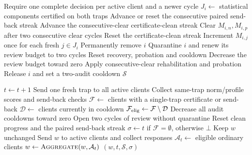 \begin{algorithm}[!htb]
\caption{Phase III: confirm evidence and bound review}\label{alg:confirmation}
\begin{algorithmic}[1]\small
{}
 \State Require one complete decision per active client and a newer cycle
  \State $J_i\gets$ statistical components certified on both traps
  \State Advance or reset the consecutive paired send-back streak
   \State Advance the consecutive-clear certificate-clean streak
   \State Clear $M_{i,n},M_{i,p}$ after two consecutive clear cycles
  \Else
   \State Reset the certificate-clean streak
   \State Increment $M_{i,j}$ once for each fresh $j\in J_i$\label{ln:confirm:increment}
  \EndIf
   \State Permanently remove $i$\label{ln:confirm:remove}
   \State Quarantine $i$ and renew its review budget to two cycles\label{ln:confirm:review}
   \State Reset recovery, probation and cooldown
  \Else
   \State Decrease the review budget toward zero
   \State Apply consecutive-clear rehabilitation and probation
    \State Release $i$ and set a two-audit cooldown\label{ln:confirm:release}
   \EndIf
  \EndIf
 \EndFor
 \State \Return $\mathcal S$
\EndProcedure
\end{algorithmic}
\end{algorithm}

\begin{algorithm}[!htb]
\caption{Phase IV: ordinary rounds and sparse audits}\label{alg:sparse}
\begin{algorithmic}[1]\small
{}
 \State $t\gets t+1$
  \State Send one fresh trap to all active clients
  \State Collect same-trap norm/profile scores and send-back checks\label{ln:sparse:measure}
  \State $\mathcal F\gets$ clients with a single-trap certificate or send-back
  \State $\mathcal D\gets$ clients currently in cooldown
  \State $\mathcal F_{\rm elig}\gets\mathcal F\setminus\mathcal D$\label{ln:sparse:eligible}
  \State Decrease all audit cooldowns toward zero
   \State Open two cycles of review without quarantine\label{ln:sparse:enroll}
   \State Reset clean progress and the paired send-back streak
  \EndFor
  \State $\sigma\gets t$ if $\mathcal F=\emptyset$, otherwise $\bot$\label{ln:sparse:clock}
  \State Keep $w$ unchanged
 \Else
  \State Send $w$ to active clients and collect responses
  \State $\mathcal A_t\gets$ eligible ordinary clients
  \State $w\gets\Call{Aggregate}{w,\mathcal A_t}$
 \EndIf
 \State \Return $(w,t,\mathcal S,\sigma)$
\EndProcedure
\end{algorithmic}
\end{algorithm}
